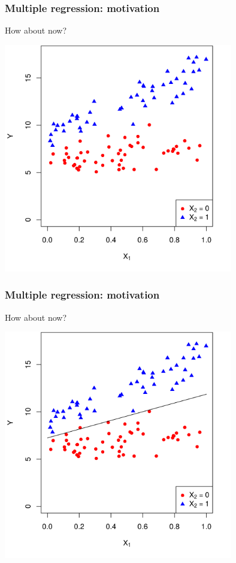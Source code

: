 \documentclass[12pt, 
hyperref={colorlinks=true, linkcolor=blue, urlcolor=cyan}]{beamer}
\begin{document}
\begin{frame}
\frametitle{Multiple regression: motivation}
How about now?

\centering
\includegraphics[width=0.75\textwidth]{plots/effect_modification_colored.png}

\end{frame}

\begin{frame}
\frametitle{Multiple regression: motivation}
How about now?

\centering
\includegraphics[width=0.75\textwidth]{plots/effect_modification_colored_with_simple_line.png}

\end{frame}
\end{document}
